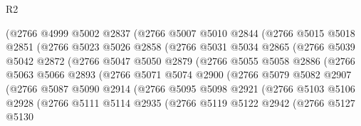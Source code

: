 \begin{lexlean}{R2}
\begin{coremodule}
                (@2766
                  @4999
                  @5002
                  @2837
                  (@2766
                    @5007
                    @5010
                    @2844
                    (@2766
                      @5015
                      @5018
                      @2851
                      (@2766
                        @5023
                        @5026
                        @2858
                        (@2766
                          @5031
                          @5034
                          @2865
                          (@2766
                            @5039
                            @5042
                            @2872
                            (@2766
                              @5047
                              @5050
                              @2879
                              (@2766
                                @5055
                                @5058
                                @2886
                                (@2766
                                  @5063
                                  @5066
                                  @2893
                                  (@2766
                                    @5071
                                    @5074
                                    @2900
                                    (@2766
                                      @5079
                                      @5082
                                      @2907
                                      (@2766
                                        @5087
                                        @5090
                                        @2914
                                        (@2766
                                          @5095
                                          @5098
                                          @2921
                                          (@2766
                                            @5103
                                            @5106
                                            @2928
                                            (@2766
                                              @5111
                                              @5114
                                              @2935
                                              (@2766
                                                @5119
                                                @5122
                                                @2942
                                                (@2766
                                                  @5127
                                                  @5130

\end{coremodule}
\end{lexlean}
